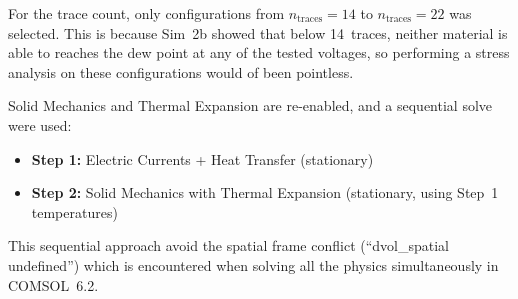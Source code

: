 For the trace count, only configurations from $n_\text{traces} = 14$ to $n_\text{traces} = 22$ was selected. This is because Sim~2b showed that below 14~traces, neither material is able to reaches the dew point at any of the tested voltages, so performing a stress analysis on these configurations would of been pointless.

Solid Mechanics and Thermal Expansion are re-enabled, and a sequential solve were used:
\begin{itemize}
    \item \textbf{Step 1:} Electric Currents + Heat Transfer (stationary)
    \item \textbf{Step 2:} Solid Mechanics with Thermal Expansion (stationary, using Step~1 temperatures)
\end{itemize}

This sequential approach avoid the spatial frame conflict (``dvol\_spatial undefined'') which is encountered when solving all the physics simultaneously in COMSOL~6.2.


